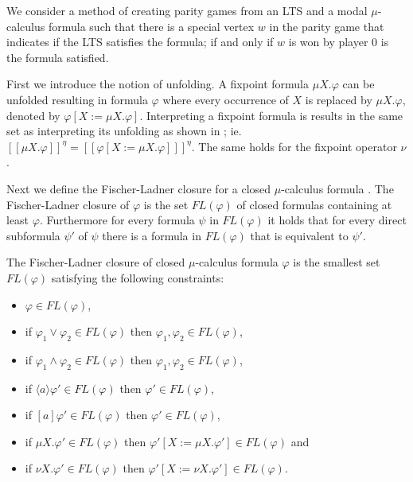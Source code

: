 We consider a method of creating parity games from an LTS and a modal $\mu$-calculus formula such that there is a special vertex $w$ in the parity game that indicates if the LTS satisfies the formula; if and only if $w$ is won by player 0 is the formula satisfied.

First we introduce the notion of unfolding. A fixpoint formula $\mu X . \varphi$ can be unfolded resulting in formula $\varphi$ where every occurrence of $X$ is replaced by $\mu X . \varphi$, denoted by $\varphi [ X:= \mu X . \varphi]$. Interpreting a fixpoint formula is results in the same set as interpreting its unfolding as shown in \cite{Bradfield2018}; ie. $[\![\mu X . \varphi]\!]^\eta = [\![\varphi[X:=\mu X . \varphi]]\!]^\eta$. The same holds for the fixpoint operator $\nu$.

Next we define the Fischer-Ladner closure for a closed $\mu$-calculus formula 
\cite{STREETT1989249,FISCHER1979194}. The Fischer-Ladner closure of $\varphi$ is the set $\textit{FL}(\varphi)$ of closed formulas containing at least $\varphi$. Furthermore for every formula $\psi$ in $\textit{FL}(\varphi)$ it holds that for every direct subformula $\psi'$ of $\psi$ there is a formula in $\textit{FL}(\varphi)$ that is equivalent to $\psi'$.
\begin{definition}
	\label{def_FLClosure}
	The Fischer-Ladner closure of closed $\mu$-calculus formula $\varphi$ is the smallest set $\textit{FL}(\varphi)$ satisfying the following constraints:
	\begin{itemize}
		\item $\varphi \in \textit{FL}(\varphi)$,
		\item if $\varphi_1 \vee \varphi_2 \in \textit{FL}(\varphi)$ then $\varphi_1 ,\varphi_2 \in \textit{FL}(\varphi)$,
		\item if $\varphi_1 \wedge \varphi_2 \in \textit{FL}(\varphi)$ then $\varphi_1 ,\varphi_2 \in \textit{FL}(\varphi)$,
		\item if $\langle a \rangle \varphi' \in \textit{FL}(\varphi)$ then $\varphi' \in \textit{FL}(\varphi)$,
		\item if $[ a ] \varphi' \in \textit{FL}(\varphi)$ then $\varphi' \in \textit{FL}(\varphi)$,
		\item if $\mu X . \varphi' \in \textit{FL}(\varphi)$ then $\varphi'[X:= \mu X . \varphi'] \in \textit{FL}(\varphi)$ and
		\item if $\nu X . \varphi' \in \textit{FL}(\varphi)$ then $\varphi'[X:= \nu X . \varphi'] \in \textit{FL}(\varphi)$.
		
	\end{itemize}
\end{definition}

